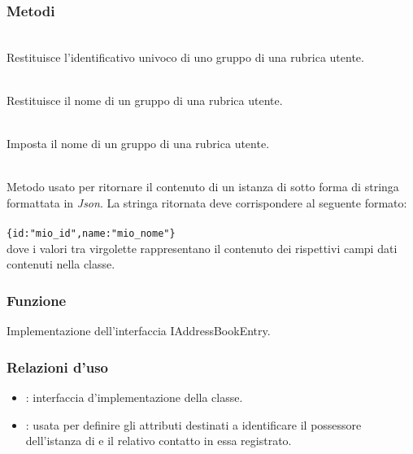 \subsubsection*{Metodi}

\begin{description}
	\item{}\\
	Restituisce l'identificativo univoco di uno gruppo di una rubrica utente.
	\item{}\\
	Restituisce il nome di un gruppo di una rubrica utente.
	\item{}\\
	Imposta il nome di un gruppo di una rubrica utente.
	\item{}\\
	Metodo usato per ritornare il contenuto di un istanza di  sotto forma di stringa formattata in \textit{Json}. La stringa ritornata deve corrispondere al seguente formato:\\\\
	\verb|{id:"mio_id",name:"mio_nome"}|\\
	
	dove i valori tra virgolette rappresentano il contenuto dei rispettivi campi dati contenuti nella classe.
\end{description}


\subsubsection*{Funzione}
Implementazione dell'interfaccia IAddressBookEntry.

\subsubsection*{Relazioni d'uso}

\begin{itemize}
	\item {}: interfaccia d'implementazione della classe.
	\item {}: usata per definire gli attributi destinati a identificare il possessore dell'istanza di  e il relativo contatto in essa registrato.
\end{itemize}

